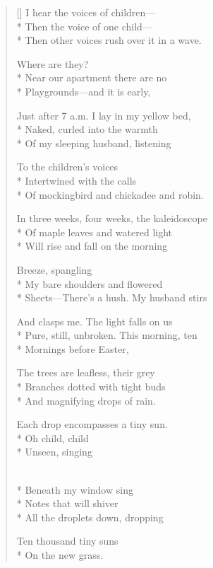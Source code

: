 \label{ch:friday_morning}
\settowidth{\versewidth}{Just after 7 a.m.     I lay in my yellow bed,}
\begin{verse}[\versewidth]
I hear the voices of children---\\*
Then the voice of one child---\\*
Then other voices rush over it in a wave.

Where are they?\\*
Near our apartment there are no\\*
Playgrounds---and it is early,

Just after 7 a.m.     I lay in my yellow bed,\\*
Naked, curled into the warmth\\*
Of my sleeping husband, listening

To the children's voices\\*
Intertwined with the calls\\*
Of mockingbird and chickadee and robin.

In three weeks, four weeks, the kaleidoscope\\*
Of maple leaves and watered light\\*
Will rise and fall on the morning

Breeze, spangling\\*
My bare shoulders and flowered\\*
Sheets---There's a hush.   My husband stirs

And clasps me.   The light falls on us\\*
Pure, still, unbroken.    This morning, ten\\*
Mornings before Easter,

The trees are leafless, their grey\\*
Branches dotted with tight buds\\*
And magnifying drops of rain.

Each drop encompasses a tiny sun.\\*
Oh child, child\\*
Unseen, singing

\\*
Beneath my window sing\\*
Notes that will shiver\\*
All the droplets down, dropping

Ten thousand tiny suns\\*
On the new grass.
\end{verse}
